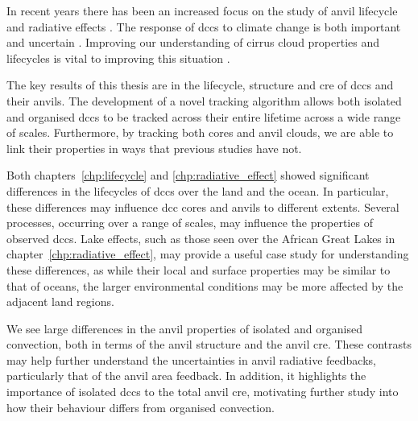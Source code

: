 




In recent years there has been an increased focus on the study of anvil lifecycle \citep{wall_life_2018, sokol_tropical_2020} and radiative effects \citep{bouniol_life_2021}.
The response of \acrshort{dcc}s to climate change is both important and uncertain \citep{sherwood_assessment_2020, hill_climate_2023}.
Improving our understanding of cirrus cloud properties and lifecycles is vital to improving this situation \citep{sullivan_ice_2021, gasparini_opinion_2023}.

The key results of this thesis are in the lifecycle, structure and \acrshort{cre} of \acrshort{dcc}s and their anvils.
The development of a novel tracking algorithm allows both isolated and organised \acrshort{dcc}s to be tracked across their entire lifetime across a wide range of scales.
Furthermore, by tracking both cores and anvil clouds, we are able to link their properties in ways that previous studies have not.

Both chapters~\ref{chp:lifecycle} and \ref{chp:radiative_effect} showed significant differences in the lifecycles of \acrshort{dcc}s over the land and the ocean.
In particular, these differences may influence \acrshort{dcc} cores and anvils to different extents.
Several processes, occurring over a range of scales, may influence the properties of observed \acrshort{dcc}s.
Lake effects, such as those seen over the African Great Lakes in chapter~\ref{chp:radiative_effect}, may provide a useful case study for understanding these differences, as while their local and surface properties may be similar to that of oceans, the larger environmental conditions may be more affected by the adjacent land regions.

We see large differences in the anvil properties of isolated and organised convection, both in terms of the anvil structure and the anvil \acrshort{cre}.
These contrasts may help further understand the uncertainties in anvil radiative feedbacks, particularly that of the anvil area feedback.
In addition, it highlights the importance of isolated \acrshort{dcc}s to the total anvil \acrshort{cre}, motivating further study into how their behaviour differs from organised convection.

